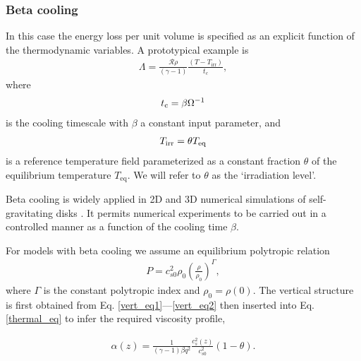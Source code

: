 \subsubsection{Beta cooling}
In this case the energy loss per unit volume is specified 
as an explicit function of the thermodynamic variables. 
A prototypical example is 
\begin{align}\label{beta_cool}
  \Lambda =
  \frac{\mathcal{R}\rho}{(\gamma-1)}\frac{\left(T-T_\mathrm{irr}\right)}{t_c}, 
\end{align}
where 
\begin{align}
  t_\mathrm{c} = \beta\Omega^{-1} 
\end{align}
is the cooling timescale with $\beta$ a constant input parameter, and
\begin{align}
  T_\mathrm{irr} = \theta T_\mathrm{eq}
\end{align}
is a reference temperature field parameterized as a constant fraction
$\theta$ of the equilibrium temperature $T_\mathrm{eq}$. We will refer
to $\theta$ as the `irradiation level'.  

   Beta cooling is widely applied in 2D and 3D
numerical simulations of self-gravitating disks \citep{gammie01,
  rice05,baehr15}. It permits numerical experiments to be carried out in a
controlled manner as a function of the cooling time $\beta$. 

For models with beta cooling we assume an equilibrium polytropic relation
\begin{align} 
  P  =
c_{s0}^2\rho_0\left(\frac{\rho}{\rho_0}\right)^\Gamma,
\end{align}
where $\Gamma$ is the constant polytropic index and $\rho_0 =
\rho(0)$. The vertical
structure is first obtained from Eq. \ref{vert_eq1}---\ref{vert_eq2}
then inserted into Eq. \ref{thermal_eq} to infer the required
viscosity profile,  

\begin{align}\label{alpha_beta_relation}
\alpha(z) = \frac{1}{(\gamma-1)\beta
   q^2}\frac{c_s^2(z)}{c_{s0}^2}\left(1 - \theta\right). 
\end{align}


